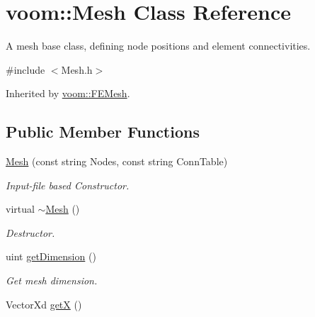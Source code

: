 \hypertarget{classvoom_1_1_mesh}{
\section{voom::Mesh Class Reference}
\label{classvoom_1_1_mesh}
}


A mesh base class, defining node positions and element connectivities.  


{\ttfamily \#include $<$Mesh.h$>$}

Inherited by \hyperlink{classvoom_1_1_f_e_mesh}{voom::FEMesh}.\subsection*{Public Member Functions}
\begin{DoxyCompactItemize}
\item 
\hypertarget{classvoom_1_1_mesh_acd7aedd7e47324e5b47d9dc6c7cfec77}{
\hyperlink{classvoom_1_1_mesh_acd7aedd7e47324e5b47d9dc6c7cfec77}{Mesh} (const string Nodes, const string ConnTable)}
\label{classvoom_1_1_mesh_acd7aedd7e47324e5b47d9dc6c7cfec77}

\begin{DoxyCompactList}\small\item\em Input-\/file based Constructor. \item\end{DoxyCompactList}\item 
\hypertarget{classvoom_1_1_mesh_ab88def99cb5f96a540aa10ba1f03cf10}{
virtual \hyperlink{classvoom_1_1_mesh_ab88def99cb5f96a540aa10ba1f03cf10}{$\sim$Mesh} ()}
\label{classvoom_1_1_mesh_ab88def99cb5f96a540aa10ba1f03cf10}

\begin{DoxyCompactList}\small\item\em Destructor. \item\end{DoxyCompactList}\item 
\hypertarget{classvoom_1_1_mesh_ab32d805ae4bfe55fe43f361aef3297c8}{
uint \hyperlink{classvoom_1_1_mesh_ab32d805ae4bfe55fe43f361aef3297c8}{getDimension} ()}
\label{classvoom_1_1_mesh_ab32d805ae4bfe55fe43f361aef3297c8}

\begin{DoxyCompactList}\small\item\em Get mesh dimension. \item\end{DoxyCompactList}\item 
\hypertarget{classvoom_1_1_mesh_ad20432a7399b309fd99490b8b58c97ce}{
VectorXd \hyperlink{classvoom_1_1_mesh_ad20432a7399b309fd99490b8b58c97ce}{getX} ()}
\label{classvoom_1_1_mesh_ad20432a7399b309fd99490b8b58c97ce}


\end{DoxyCompactItemize}
